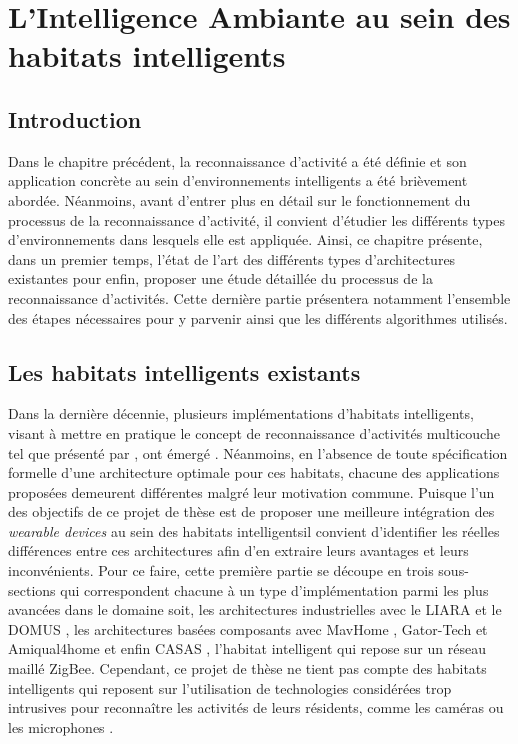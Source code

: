 \chapter{L'Intelligence Ambiante au sein des habitats intelligents}
\label{chap:2}

\section{Introduction}

Dans le chapitre précédent, la reconnaissance d'activité a été définie et son application concrète au sein d'environnements intelligents a été brièvement abordée. Néanmoins, avant d'entrer plus en détail sur le fonctionnement du processus de la reconnaissance d'activité, il convient d'étudier les différents types d'environnements dans lesquels elle est appliquée. Ainsi, ce chapitre présente, dans un premier temps, l'état de l'art des différents types d'architectures existantes pour enfin, proposer une étude détaillée du processus de la reconnaissance d'activités. Cette dernière partie présentera notamment l'ensemble des étapes nécessaires pour y parvenir ainsi que les différents algorithmes utilisés.

\section{Les habitats intelligents existants}

Dans la dernière décennie, plusieurs implémentations d'habitats intelligents, visant à mettre en pratique le concept de reconnaissance d'activités multicouche tel que présenté par \cite{Roy2013}, ont émergé \citep{DJCook2003, Helal2005, Giroux2009, Cook2013, Bouchard2014, Lago2017}. Néanmoins, en l'absence de toute spécification formelle d'une architecture optimale pour ces habitats, chacune des applications proposées demeurent différentes malgré leur motivation commune. Puisque l'un des objectifs de ce projet de thèse est de proposer une meilleure intégration des \textit{wearable devices} au sein des habitats intelligents\textemdash il convient d'identifier les réelles différences entre ces architectures afin d'en extraire leurs avantages et leurs inconvénients. Pour ce faire, cette première partie se découpe en trois sous-sections qui correspondent chacune à un type d'implémentation parmi les plus avancées dans le domaine soit, les architectures industrielles avec le \acs{LIARA} \citep{Bouchard2014} et le \acs{DOMUS} \citep{Giroux2009}, les architectures basées composants avec MavHome \citep{DJCook2003}, Gator-Tech \citep{Helal2005} et Amiqual4home \citep{Lago2017} et enfin CASAS \citep{Cook2013}, l'habitat intelligent qui repose sur un réseau maillé ZigBee. Cependant, ce projet de thèse ne tient pas compte des habitats intelligents qui reposent sur l'utilisation de technologies considérées trop intrusives pour reconnaître les activités de leurs résidents, comme les caméras ou les microphones \citep{Brumitt2000, Vacher2011}.

